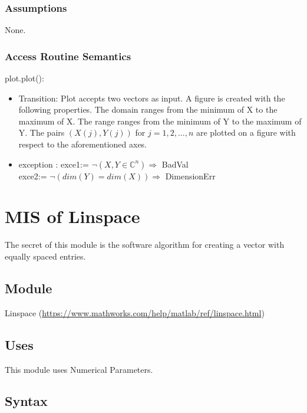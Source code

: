 \documentclass[12pt, titlepage]{article}
\begin{document}
\subsubsection{Assumptions}

None.

\subsubsection{Access Routine Semantics}

\noindent plot.plot():
\begin{itemize}
	\item Transition: Plot accepts two vectors as input. A figure is created 
	with the following properties. The domain ranges from the minimum of X to 
	the maximum of X. The range ranges from the minimum of Y to the maximum of 
	Y. The pairs $(X(j),Y(j))$ for $j=1,2,...,n$ are plotted on a figure with 
	respect to the aforementioned axes. 
	\item exception : exce1:= $\neg(X,Y \in \mathbb{C}^{n}) \Rightarrow$ 
	BadVal \\
	exce2:= $\neg (dim(Y) = dim(X)) \Rightarrow$ DimensionErr \\
\end{itemize}

\newpage 

\section{MIS of Linspace} 

The secret of this module is the software algorithm for creating a vector with 
equally spaced entries. 

\subsection{Module}

Linspace (\url{https://www.mathworks.com/help/matlab/ref/linspace.html})

\subsection{Uses}

This module uses Numerical Parameters. 

\subsection{Syntax}
\end{document}
